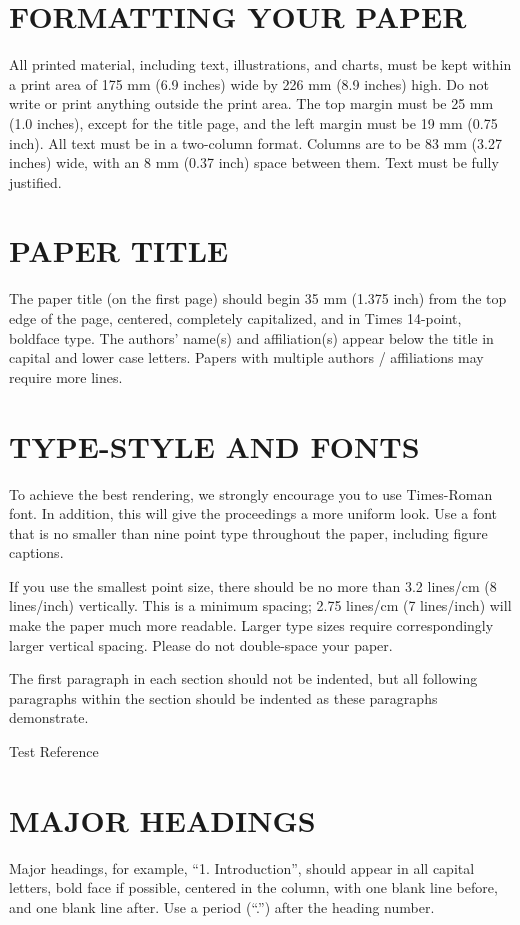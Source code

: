 \documentclass[10pt,twocolumn]{article}
\begin{document}
\section{FORMATTING YOUR PAPER}
All printed material, including text, illustrations, and charts, must be kept within a print area of 175 mm (6.9 inches) wide by 226 mm (8.9 inches) high. Do not write or print anything outside the print area. The top margin must be 25 mm (1.0 inches), except for the title page, and the left margin must be 19 mm (0.75 inch). All text must be in a two-column format. Columns are to be 83 mm (3.27 inches) wide, with an 8 mm (0.37 inch) space between them. Text must be fully justified.


\section{PAPER TITLE}
The paper title (on the first page) should begin 35 mm (1.375 inch) from the top edge of the page, centered, completely capitalized, and in Times 14-point, boldface type. The authors’ name(s) and affiliation(s) appear below the title in capital and lower case letters. Papers with multiple authors / affiliations may require more lines.


\section{TYPE-STYLE AND FONTS}
To achieve the best rendering, we strongly encourage you to use Times-Roman font. In addition, this will give the proceedings a more uniform look. Use a font that is no smaller than nine point type throughout the paper, including figure captions.

If you use the smallest point size, there should be no more than 3.2 lines/cm (8 lines/inch) vertically. This is a minimum spacing; 2.75 lines/cm (7 lines/inch) will make the paper much more readable. Larger type sizes require correspondingly larger vertical spacing. Please do not double-space your paper.

The first paragraph in each section should not be indented, but all following paragraphs within the section should be indented as these paragraphs demonstrate.






Test Reference \cite{ref1,ref2}



\section{MAJOR HEADINGS}
Major headings, for example, “1. Introduction”, should appear in all capital letters, bold face if possible, centered in the column, with one blank line before, and one blank line after. Use a period (“.”) after the heading number.
\end{document}

